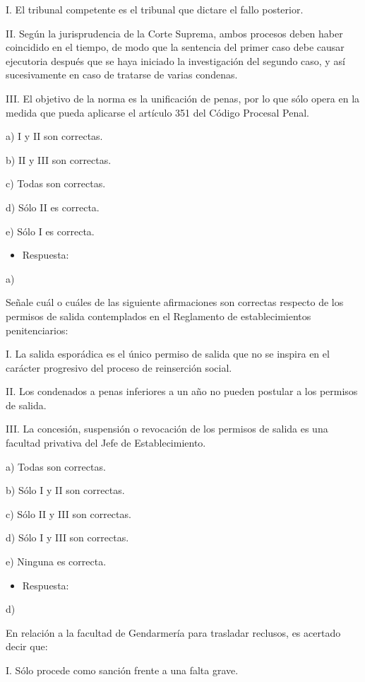 \documentclass[letterpaper, 11pt]{article}
\begin{document}
I. El tribunal competente es el tribunal que dictare el fallo posterior.

II. Según la jurisprudencia de la Corte Suprema, ambos procesos deben haber
coincidido en el tiempo, de modo que la sentencia del primer caso debe causar
ejecutoria después que se haya iniciado la investigación del segundo caso, y así
sucesivamente en caso de tratarse de varias condenas.

III. El objetivo de la norma es la unificación de penas, por lo que sólo opera en la
medida que pueda aplicarse el artículo 351 del Código Procesal Penal.

a) I y II son correctas.

b) II y III son correctas.

c) Todas son correctas.

d) Sólo II es correcta.

e) Sólo I es correcta.

\begin{itemize}
\item Respuesta:
\end{itemize}
a)

Señale cuál o cuáles de las siguiente afirmaciones son correctas respecto de los
permisos de salida contemplados en el Reglamento de establecimientos
penitenciarios:

I. La salida esporádica es el único permiso de salida que no se inspira en el carácter
progresivo del proceso de reinserción social.

II. Los condenados a penas inferiores a un año no pueden postular a los permisos de
salida.

III. La concesión, suspensión o revocación de los permisos de salida es una facultad
privativa del Jefe de Establecimiento.

a) Todas son correctas.

b) Sólo I y II son correctas.

c) Sólo II y III son correctas.

d) Sólo I y III son correctas.

e) Ninguna es correcta.

\begin{itemize}
\item Respuesta:
\end{itemize}
d)


En relación a la facultad de Gendarmería para trasladar reclusos, es acertado decir
que:

I. Sólo procede como sanción frente a una falta grave.
\end{document}
